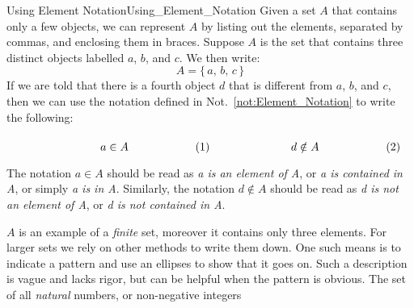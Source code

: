     \begin{fexample}{Using Element Notation}{Using_Element_Notation}
        Given a set $A$ that contains only a few objects, we can represent $A$
        by listing out the elements, separated by commas, and enclosing them in
        braces. Suppose $A$ is the set that contains three distinct objects
        labelled $a$, $b$, and $c$. We then write:
        \begin{equation}
            A=\big\{\,a,\,b,\,c\,\big\}
        \end{equation}
        If we are told that there is a fourth object $d$ that is different from
        $a$, $b$, and $c$, then we can use the notation defined in
        Not.~\ref{not:Element_Notation} to write the following:
        \par\hfill\par
        \begin{subequations}
            \begin{minipage}[b]{0.49\textwidth}
                \begin{equation}
                    a\in{A}
                \end{equation}
            \end{minipage}
            \hfill
            \begin{minipage}[b]{0.49\textwidth}
                \begin{equation}
                    d\notin{A}
                \end{equation}
            \end{minipage}
        \end{subequations}
        \par\vspace{2.5ex}
        The notation $a\in{A}$ should be read as \textit{a is an element of A},
        or \textit{a is contained in A}, or simply \textit{a is in A}.
        Similarly, the notation $d\notin{A}$ should be read as
        \textit{d is not an element of A}, or \textit{d is not contained in A}.
        \par\hfill\par
        $A$ is an example of a \textit{finite} set, moreover it contains only
        three elements. For larger sets we rely on other methods to write them
        down. One such means is to indicate a pattern and use an ellipses to
        show that it goes on. Such a description is vague and lacks rigor, but
        can be helpful when the pattern is obvious. The set of all
        \textit{natural} numbers, or non-negative integers

\end{fexample}
